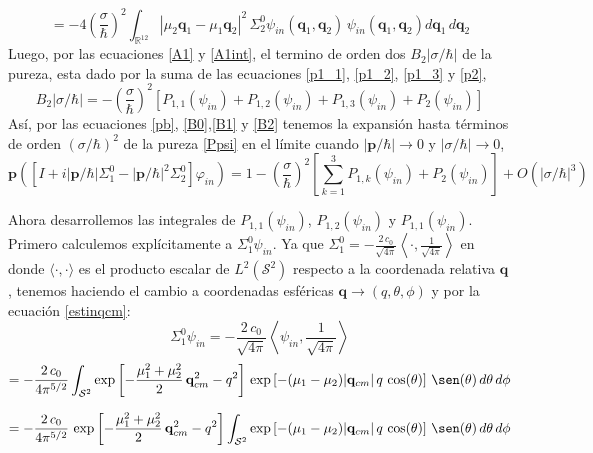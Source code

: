 \documentclass[12pt]{book}
\numberwithin{equation}{chapter}
\def\q{\mathbf{q}}
\def\R{\mathbb{R}}
\def\S{\mathcal{S}}
\def\la{\langle}
\def\ra{\rangle}
\def\vp{\varphi}
\def\P{\mathbf{p}}
\begin{document}
\begin{equation}\label{p2}
= -4 \left( \frac{\sigma}{\hbar} \right)^{2} \int_{\R^{12}} |\mu_{2}\q_{1}-\mu_{1}\q_{2}|^{2}\, \Sigma_{2}^{0} \psi_{in}(\q_{1},\q_{2})\,\psi_{in}(\q_{1},\q_{2}) d\q_{1}\, d\q_{2}
\end{equation}
Luego, por las ecuaciones \eqref{A1} y \eqref{A1int}, el termino de orden dos $B_{2}|\sigma/\hbar|$ de la pureza, esta dado por la suma de las ecuaciones \eqref{p1_1}, \eqref{p1_2}, \eqref{p1_3} y \eqref{p2},
\begin{equation}\label{B2}
B_{2}|\sigma/\hbar|= - \left( \frac{\sigma}{\hbar} \right)^{2} \left[ P_{1,1}(\psi_{in})+P_{1,2}(\psi_{in})+P_{1,3}(\psi_{in})+P_{2}(\psi_{in}) \right]
\end{equation}
As\'i, por las ecuaciones \eqref{pb}, \eqref{B0},\eqref{B1} y \eqref{B2} tenemos la expansi\'on hasta t\'erminos de orden $(\sigma/\hbar)^{2}$ de la pureza \eqref{Ppsi} en el l\'imite cuando $|\P/\hbar|\rightarrow 0$ y $|\sigma/\hbar|\rightarrow 0$,
\begin{equation}\label{exppur}
\P \left( \left[I + i|\P/\hbar| \Sigma_{1}^{0} - |\P/\hbar|^{2} \Sigma_{2}^{0} \right] \vp_{in} \right) = 1-\left( \frac{\sigma}{\hbar} \right)^{2} \left[ \sum_{k=1}^{3} P_{1,k}(\psi_{in})+P_{2}(\psi_{in}) \right]+O(|\sigma/\hbar|^{3})
\end{equation}

Ahora desarrollemos las integrales de $P_{1,1}(\psi_{in})$, $P_{1,2}(\psi_{in})$ y $P_{1,1}(\psi_{in})$. Primero calculemos expl\'icitamente a $\Sigma_{1}^{0} \psi_{in}$. Ya que $\Sigma_{1}^{0}= -\frac{2\, c_{0}}{\sqrt{4\pi}} \left\la \cdot , \frac{1}{\sqrt{4\pi}} \right\ra $ en donde $\la \cdot , \cdot \ra $ es el producto escalar de $L^{2}(\S^{2})$ respecto a la coordenada relativa $\q$, tenemos haciendo el cambio a coordenadas esf\'ericas $\q \longrightarrow (q,\theta,\phi)$ y por la ecuaci\'on \eqref{estinqcm}:
$$ \Sigma_{1}^{0} \psi_{in} = -\frac{2\, c_{0}}{\sqrt{4\pi}} \left\la \psi_{in} , \frac{1}{\sqrt{4\pi}} \right\ra $$
$$= -\frac{2\, c_{0}}{4\pi^{5/2}} \int_{\S^{2}} \exp \left[ -\frac{\mu_{1}^{2}+\mu_{2}^{2}}{2}\, \q_{cm}^{2} - q^{2} \right]\, \exp \left[ -(\mu_{1} - \mu_{2}) |\q_{cm}|\, q \, \cos (\theta) \right] \, \sen(\theta)\, d\theta \, d\phi $$

$$ = -\frac{2\, c_{0}}{4\pi^{5/2}}\, \exp \left[ -\frac{\mu_{1}^{2}+\mu_{2}^{2}}{2}\, \q_{cm}^{2} - q^{2} \right] \int_{\S^{2}} \exp \left[ -(\mu_{1} - \mu_{2}) |\q_{cm}|\, q \, \cos (\theta) \right] \, \sen(\theta)\, d\theta \, d\phi $$
\end{document}

